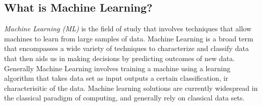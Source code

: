 \documentclass[hidelinks,11pt]{article}
\begin{document}
\subsection{What is Machine Learning?}

	\textit{Machine Learning (ML)} is the field of study that involves techniques that allow machines to learn from large samples of data. Machine Learning is a broad term that encompasses a wide variety of techniques to characterize and classify data that then aids us in making decisions by predicting outcomes of new data. Generally Machine Learning involves training a machine using a learning algorithm that takes data set as input outputs a certain classification, ir characterisitic of the data. Machine learning solutions are currently widespread in the classical paradigm of computing, and generally rely on classical data sets.\cite {inproceedings}
	\paragraph{}
	\paragraph{}
\end{document}
